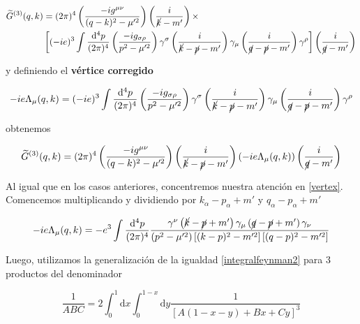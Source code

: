 \documentclass[tickz]{article}
\numberwithin{equation}{section}
\begin{document}
\begin{equation}\label{key}
\begin{aligned}
\widetilde{G}^{(3)}(q,k)&=(2\pi)^4 \left( \frac{-ig^{\mu\nu}}{(q-k)^2-\mu'^2} \right) \left( \frac{i}{\cancel{k}-m'} \right) \times\\
& \left[ (-ie)^3\int \frac{\mathrm{d^4}p}{(2\pi)^4} \left(\frac{-ig_{\sigma\rho}}{p^2-\mu'^2}\right) \gamma^{\sigma}\left(\frac{i}{\cancel{k}-\cancel{p}-m'}\right)\gamma_{\mu}\left(\frac{i}{\cancel{q}-\cancel{p} -m'}\right)\gamma^{\rho}  \right] \left(\frac{i}{\cancel{q}-m'}\right)
\end{aligned}
\end{equation}

y definiendo el \textbf{vértice corregido}

\begin{equation}\label{vertex}
-ie\Lambda_{\mu}(q,k)=(-ie)^3\int \frac{\mathrm{d^4}p}{(2\pi)^4} \left(\frac{-ig_{\sigma\rho}}{p^2-\mu'^2}\right) \gamma^{\sigma}\left(\frac{i}{\cancel{k}-\cancel{p}-m'}\right)\gamma_{\mu}\left(\frac{i}{\cancel{q}-\cancel{p} -m'}\right)\gamma^{\rho}
\end{equation}

obtenemos

\begin{equation}\label{key}
\widetilde{G}^{(3)}(q,k)=(2\pi)^4 \left(\frac{-ig^{\mu\nu}}{(q-k)^2-\mu'^2}\right)\left(\frac{i}{\cancel{k}-\cancel{p}-m'}\right) \left(-ie\Lambda_{\mu}(q,k)\right)\left(\frac{i}{\cancel{q}-m'}\right)
\end{equation}

Al igual que en los casos anteriores, concentremos nuestra atención en \ref{vertex}. Comencemos multiplicando y dividiendo por $ k_{\alpha}-p_{\alpha} +m' $ y $ q_{\alpha}-p_{\alpha} +m' $

\begin{equation}
-ie\Lambda_{\mu}(q,k)=-e^3\int \frac{\mathrm{d^4}p}{(2\pi)^4} \frac{  \gamma^{\nu}\left(\cancel{k}-\cancel{p} +m'\right)\gamma_{\mu}\left( \cancel{q}-\cancel{p} +m'\right)\gamma_{\nu}}{\left(p^2-\mu'^2\right)\left[(k-p)^2-m'^2\right]\left[(q-p)^2 -m'^2\right]}
\end{equation}

Luego, utilizamos la generalización de la igualdad \ref{integralfeynman2} para 3 productos del denominador

\begin{equation}\label{integralfeynman3}
\frac{1}{ABC}=2\int_0^1\mathrm{d}x\int_0^{1-x}\mathrm{d}y \frac{1}{\left[A(1-x-y)+Bx+Cy\right]^3}
\end{equation}
\end{document}
